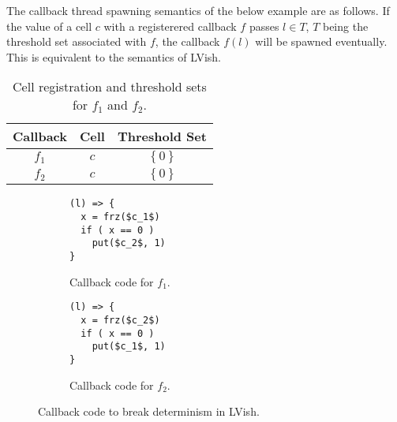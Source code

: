 The callback thread spawning semantics of the below example are as follows. If
the value of a cell $c$ with a registerered callback $f$ passes $l \in T$, $T$
being the threshold set associated with $f$, the callback $f(l)$ will be spawned
eventually. This is equivalent to the semantics of LVish.


\begin{table}
  \centering
  \begin{tabular}{c|c|c}
    Callback & Cell & Threshold Set \\
    \hline
    $f_1$ & $c$ & $\left\{ 0 \right\}$ \\
    $f_2$ & $c$ & $\left\{ 0 \right\}$ \\
  \end{tabular}
  \caption{Cell registration and threshold sets for $f_1$ and $f_2$.}
  \label{tab:cellreg}
\end{table}
\begin{figure}
  \centering
  \begin{subfigure}[t]{0.4\textwidth}
    \begin{lstlisting}[mathescape=true]
(l) => {
  x = frz($c_1$)
  if ( x == 0 )
    put($c_2$, 1)
}
    \end{lstlisting}
    \caption{Callback code for $f_1$.}
  \end{subfigure}
  \quad
  \begin{subfigure}[t]{0.4\textwidth}
    \begin{lstlisting}[mathescape=true]
(l) => {
  x = frz($c_2$)
  if ( x == 0 )
    put($c_1$, 1)
}
    \end{lstlisting}
    \caption{Callback code for $f_2$.}
  \end{subfigure}
  \caption{Callback code to break determinism in LVish.}
  \label{fig:lvish_fun_breaking}
\end{figure}

